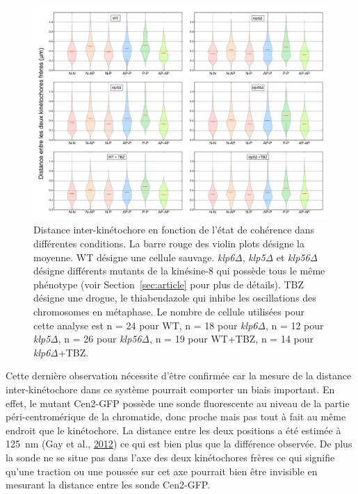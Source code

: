 \documentclass[12pt,a4paper,twoside,openright]{book}
\begin{document}
\begin{figure}[htbp]
\centering
\includegraphics{figures/results/imaging/coherence_stretch.png}
\caption[Distance inter-kinétochore en fonction de l'état de cohérence dans différentes conditions]{\label{fig:coherence_stretch}Distance
inter-kinétochore en fonction de l'état de cohérence dans différentes
conditions. La barre rouge des violin plots désigne la moyenne. WT
désigne une cellule sauvage. \emph{klp6Δ}, \emph{klp5Δ} et \emph{klp56Δ}
désigne différents mutants de la kinésine-8 qui possède tous le même
phénotype (voir Section~\ref{sec:article} pour plus de détails). TBZ
désigne une drogue, le thiabendazole qui inhibe les oscillations des
chromosomes en métaphase. Le nombre de cellule utilisées pour cette
analyse est n = 24 pour WT, n = 18 pour \emph{klp6Δ}, n = 12 pour
\emph{klp5Δ}, n = 26 pour \emph{klp56Δ}, n = 19 pour WT+TBZ, n = 14 pour
\emph{klp6Δ}+TBZ.}
\end{figure}

Cette dernière observation nécessite d'être confirmée car la mesure de
la distance inter-kinétochore dans ce système pourrait comporter un
biais important. En effet, le mutant Cen2-GFP possède une sonde
fluorescente au niveau de la partie péri-centromérique de la chromatide,
donc proche mais pas tout à fait au même endroit que le kinétochore. La
distance entre les deux positions a été estimée à 125~nm (Gay et al.,
\protect\hyperlink{ref-Gay2012a}{2012}) ce qui est bien plus que la
différence observée. De plus la sonde ne se situe pas dans l'axe des
deux kinétochores frères ce qui signifie qu'une traction ou une poussée
sur cet axe pourrait bien être invisible en mesurant la distance entre
les sonde Cen2-GFP.
\end{document}
